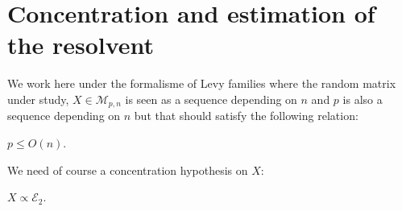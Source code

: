 \documentclass[a4papaer, titlepage]{book}
\begin{document}



\section{Concentration and estimation of the resolvent}\label{sec:main_res_lipschitz}
   



We work here under the formalisme of Levy families where the random matrix under study, $X \in \mathcal{M}_{p,n}$ is seen as a sequence depending on $n$ and $p$ is also a sequence depending on $n$ but that should satisfy the following relation:
 \begin{assumption}\label{ass:n_p_commensurable}
  $p\leq O(n)$.
\end{assumption}
 We need of course a concentration hypothesis on $X$:
\begin{assumption}\label{ass:concentration_X}
  $X \propto \mathcal E_2$.
\end{assumption}
\end{document}
